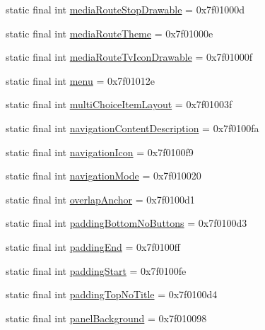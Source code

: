 \begin{CompactItemize}
static final int \hyperlink{classandroid_1_1support_1_1transition_1_1_r_1_1attr_a6019f725661c11293d7008fd2299ce8}{mediaRouteStopDrawable} = 0x7f01000d
\item 
static final int \hyperlink{classandroid_1_1support_1_1transition_1_1_r_1_1attr_55f05a4909d5d55f697202e479d57b68}{mediaRouteTheme} = 0x7f01000e
\item 
static final int \hyperlink{classandroid_1_1support_1_1transition_1_1_r_1_1attr_a6d82279f6fc966ddaed97617fe3d02e}{mediaRouteTvIconDrawable} = 0x7f01000f
\item 
static final int \hyperlink{classandroid_1_1support_1_1transition_1_1_r_1_1attr_55435f558bbb07b050f440e61c0af68e}{menu} = 0x7f01012e
\item 
static final int \hyperlink{classandroid_1_1support_1_1transition_1_1_r_1_1attr_b9b106f69bf777c800c68a0705d7fc08}{multiChoiceItemLayout} = 0x7f01003f
\item 
static final int \hyperlink{classandroid_1_1support_1_1transition_1_1_r_1_1attr_7e03141fdeb55d645d763b8aaa789713}{navigationContentDescription} = 0x7f0100fa
\item 
static final int \hyperlink{classandroid_1_1support_1_1transition_1_1_r_1_1attr_98c3b7ead933bee3bd350c64a99f48e6}{navigationIcon} = 0x7f0100f9
\item 
static final int \hyperlink{classandroid_1_1support_1_1transition_1_1_r_1_1attr_4973f26730a5e3edcbc2a07095e185fb}{navigationMode} = 0x7f010020
\item 
static final int \hyperlink{classandroid_1_1support_1_1transition_1_1_r_1_1attr_d50ed87bb49050699d47badc4fe01485}{overlapAnchor} = 0x7f0100d1
\item 
static final int \hyperlink{classandroid_1_1support_1_1transition_1_1_r_1_1attr_724c679240925dace15aff291a88074a}{paddingBottomNoButtons} = 0x7f0100d3
\item 
static final int \hyperlink{classandroid_1_1support_1_1transition_1_1_r_1_1attr_4d9f4e1e4448cf2d59a333901d16c677}{paddingEnd} = 0x7f0100ff
\item 
static final int \hyperlink{classandroid_1_1support_1_1transition_1_1_r_1_1attr_83cda8715dbd94f13979f8abfd88214d}{paddingStart} = 0x7f0100fe
\item 
static final int \hyperlink{classandroid_1_1support_1_1transition_1_1_r_1_1attr_96edbed8c288aa3aace043382d0fe3a4}{paddingTopNoTitle} = 0x7f0100d4
\item 
static final int \hyperlink{classandroid_1_1support_1_1transition_1_1_r_1_1attr_d6c04dd979c61fae7386ae91414e5564}{panelBackground} = 0x7f010098

\end{CompactItemize}
